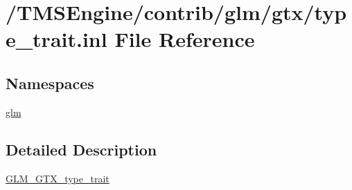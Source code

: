 \hypertarget{type__trait_8inl}{}\section{/\+T\+M\+S\+Engine/contrib/glm/gtx/type\+\_\+trait.inl File Reference}
\label{type__trait_8inl}
\subsection*{Namespaces}
\begin{DoxyCompactItemize}
\item 
 \hyperlink{namespaceglm}{glm}
\end{DoxyCompactItemize}


\subsection{Detailed Description}
\hyperlink{group__gtx__type__trait}{G\+L\+M\+\_\+\+G\+T\+X\+\_\+type\+\_\+trait} 